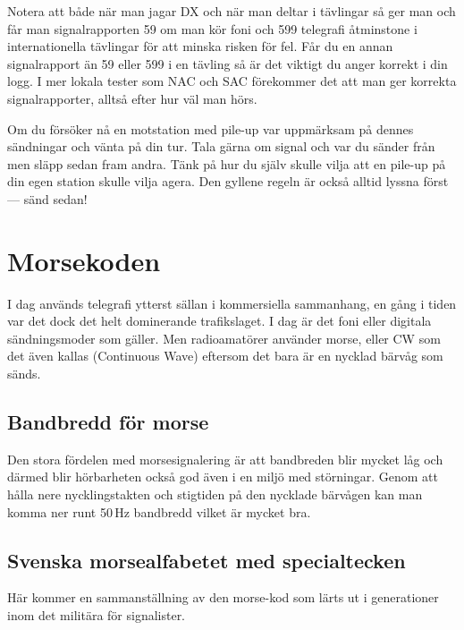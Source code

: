 Notera att både när man jagar DX och när man deltar i tävlingar så ger man och
får man signalrapporten 59 om man kör foni och 599 telegrafi åtminstone i
internationella tävlingar för att minska risken för fel. Får du en annan
signalrapport än 59 eller 599 i en tävling så är det viktigt du anger korrekt i
din logg. I mer lokala tester som NAC och SAC förekommer det att man ger
korrekta signalrapporter, alltså efter hur väl man hörs.

Om du försöker nå en motstation med pile-up var uppmärksam på dennes sändningar
och vänta på din tur. Tala gärna om signal och var du sänder från men släpp
sedan fram andra. Tänk på hur du själv skulle vilja att en pile-up på din egen
station skulle vilja agera. Den gyllene regeln är också alltid lyssna först ---
sänd sedan!

\clearpage

\section{Morsekoden}

I dag används telegrafi ytterst sällan i kommersiella sammanhang, en gång i
tiden var det dock det helt dominerande trafikslaget. I dag är det foni eller
digitala sändningsmoder som gäller. Men radioamatörer använder morse, eller CW
som det även kallas (Continuous Wave) eftersom det bara är en nycklad bärvåg
som sänds.

\subsection{Bandbredd för morse}

Den stora fördelen med morsesignalering är att bandbreden blir mycket låg och
därmed blir hörbarheten också god även i en miljö med störningar. Genom att
hålla nere nycklingstakten och stigtiden på den nycklade bärvågen kan man
komma ner runt 50\,Hz bandbredd vilket är mycket bra.

\subsection{Svenska morsealfabetet med specialtecken}
Här kommer en sammanställning av den morse-kod som lärts ut i
generationer inom det militära för signalister.

